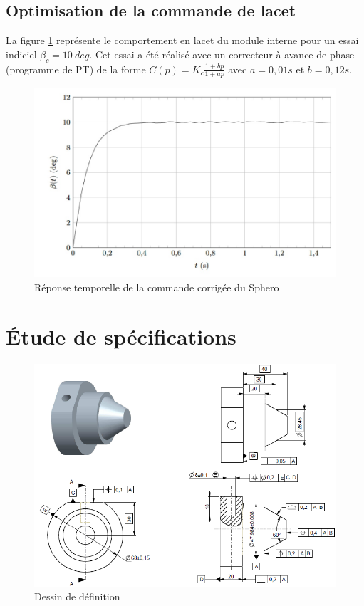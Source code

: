 \newpage

\subsection{Optimisation de la commande de lacet}

La figure \ref{fig18} représente le comportement en lacet du module interne pour un essai indiciel $\beta_c=10\ deg$. Cet essai a été réalisé avec un correcteur à avance de phase (programme de PT) de la forme $C(p)=K_c\frac{1+bp}{1+ap}$ avec $a=0,01s$ et $b=0,12s$.

\begin{figure}[!ht]\begin{center}
 \includegraphics[width=0.7\linewidth]{img/figure_18}
 \caption{Réponse temporelle de la commande corrigée du Sphero}
 \label{fig18}
\end{center}\end{figure}


\newpage

\section{Étude de spécifications}

\begin{figure}[!ht]\begin{center}
 \includegraphics[width=\linewidth]{img/specifications}
 \caption{Dessin de définition}
 \label{fig19}
\end{center}\end{figure}

